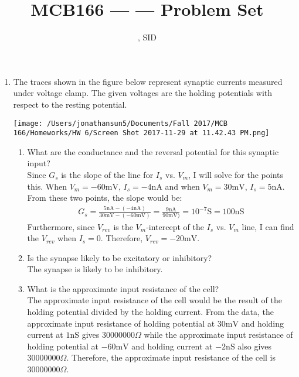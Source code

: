 \documentclass[11pt]{article}
\title{MCB166 --- \Session --- Problem Set \Homework}
\author{\Name, SID \SID}
\date{\displaydate{date}}
\begin{document}
\maketitle

\newpage
\begin{enumerate}[label=\arabic*.]
\item
The traces shown in the figure below represent synaptic currents measured under voltage clamp. The given voltages are the holding potentials with respect to the resting potential.
\begin{center}
\texttt{[image: /Users/jonathansun5/Documents/Fall 2017/MCB 166/Homeworks/HW 6/Screen Shot 2017-11-29 at 11.42.43 PM.png]}
\end{center}
\begin{enumerate}[label=(\alph*)]
\item
What are the conductance and the reversal potential for this synaptic input?
\vspace*{1\baselineskip}
\\
Since $G_s$ is the slope of the line for $I_s$ vs. $V_m$, I will solve for the points this. When $V_m = -60 \text{mV}$, $I_s = -4 \text{nA}$ and when $V_m = 30 \text{mV}$, $I_s = 5 \text{nA}$. From these two points, the slope would be:
\begin{align*}
G_s = \frac{5 \text{nA} - (-4 \text{nA})} {30 \text{mV} - (-60 \text{mV})} = \frac{9 \text{nA}} {90 \text{mV})} = 10^{-7} \text{S} = 100 \text{nS}
\end{align*}
Furthermore, since $V_{rev}$ is the $V_m$-intercept of the $I_s$ vs. $V_m$ line, I can find the $V_{rev}$ when $I_s = 0$. Therefore, $V_{rev} = -20 \text{mV}$.



\item
Is the synapse likely to be excitatory or inhibitory?
\vspace*{1\baselineskip}
\\
The synapse is likely to be inhibitory.



\item
What is the approximate input resistance of the cell?
\vspace*{1\baselineskip}
\\
The approximate input resistance of the cell would be the result of the holding potential divided by the holding current. From the data, the approximate input resistance of holding potential at $30 \text{mV}$ and holding current at $1 \text{nS}$ gives $30000000 \Omega$ while the approximate input resistance of holding potential at $-60 \text{mV}$ and holding current at $-2 \text{nS}$ also gives $30000000 \Omega$. Therefore, the approximate input resistance of the cell is $30000000 \Omega$.




\end{enumerate}
\end{enumerate}
\end{document}
